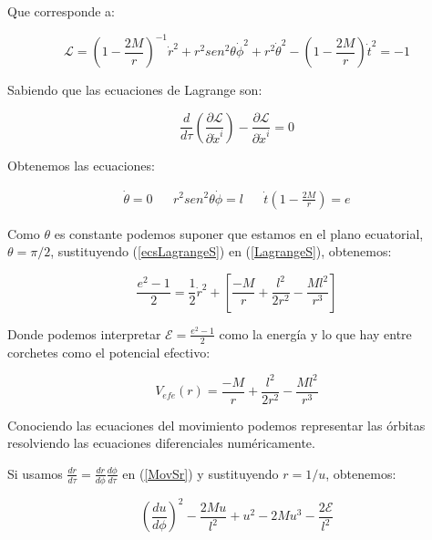 \documentclass{article}
\begin{document}
Que corresponde a:\cite{zamorageodesicas}

\begin{equation}\label{LagrangeS}
    \mathcal{L}=\left(1-\frac{2M}{r}\right)^{-1}\dot r^{2}+r^{2}sen^{2}\theta \dot \phi^{2}+r^{2}\dot \theta^{2}-\left(1-\frac{2M}{r}\right) \dot t^{2}=-1
\end{equation}

Sabiendo que las ecuaciones de Lagrange son:\cite{zamorageodesicas}

\begin{equation}
    \frac{d}{d\tau}\left(\frac{\partial \mathcal{L}}{\partial \dot x^{i}}\right)-\frac{\partial \mathcal{L}}{\partial \dot x^{i}}=0
\end{equation}

Obtenemos las ecuaciones:\cite{zamorageodesicas}

\begin{align}\label{ecsLagrangeS}
    \dot \theta=0 && r^{2}sen^{2}\theta \dot \phi=l && \dot t\left(1-\frac{2M}{r}\right)=e
\end{align}

Como $\theta$ es constante podemos suponer que estamos en el plano ecuatorial, $\theta=\pi/2$, sustituyendo (\ref{ecsLagrangeS}) en (\ref{LagrangeS}), obtenemos:\cite{zamorageodesicas}

\begin{equation}\label{MovSr}
    \frac{e^{2}-1}{2}=\frac{1}{2}\dot r^{2}+\left[ \frac{-M}{r}+\frac{l^{2}}{2r^{2}}-\frac{M l^{2}}{r^{3}}\right]
\end{equation}

Donde podemos interpretar $\mathcal{E}=\frac{e^{2}-1}{2}$ como la energía y lo que hay entre corchetes como el potencial efectivo:\cite{zamorageodesicas}

\begin{equation}
    V_{efe}(r)= \frac{-M}{r}+\frac{l^{2}}{2r^{2}}-\frac{M l^{2}}{r^{3}}
\end{equation}

Conociendo las ecuaciones del movimiento podemos representar las órbitas resolviendo las ecuaciones diferenciales numéricamente.\cite{zamorageodesicas}

Si usamos $\frac{dr}{d\tau}=\frac{dr}{d\phi}\frac{d\phi}{d\tau}$ en (\ref{MovSr}) y sustituyendo $r=1/u$, obtenemos:\cite{zamorageodesicas}

\begin{equation}
    \left(\frac{du}{d\phi}\right)^{2}-\frac{2Mu}{l^{2}}+u^{2}-2Mu^{3}-\frac{2\mathcal{E}}{l^{2}}
\end{equation}
\end{document}
